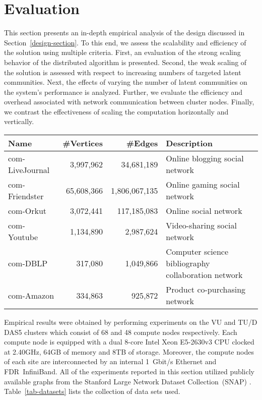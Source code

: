 \section{Evaluation}

This section presents an in-depth empirical analysis of the design discussed in
Section~\ref{design-section}. To this end, we assess the scalability and
efficiency of the solution using multiple criteria.
%
First, an evaluation of the strong scaling behavior of the distributed
algorithm is presented.
%
Second, the weak scaling of the solution is assessed with respect to increasing
numbers of targeted latent communities.
%
Next, the effects of varying the number of latent communities on the system's
performance is analyzed.
%
Further, we evaluate the efficiency and overhead associated with network
communication between cluster nodes.
%
Finally, we contrast the effectiveness of scaling the computation horizontally
and vertically.

\begin{table*}
  \centering
  \begin{tabular}{l r r l}
    Name            & \#Vertices &       \#Edges & Description \\
    \hline
    com-LiveJournal &  3,997,962 &    34,681,189 & Online blogging social network \\
    com-Friendster  & 65,608,366 & 1,806,067,135 & Online gaming social network \\
    com-Orkut       &  3,072,441 &   117,185,083 & Online social network \\
    com-Youtube     &  1,134,890 &     2,987,624 & Video-sharing social network \\
    com-DBLP        &    317,080 &     1,049,866 & Computer science bibliography collaboration network \\
    com-Amazon      &    334,863 &       925,872 & Product co-purchasing network \\
    \hline
  \end{tabular}
  \label{tab-datasets}
  \caption{Summary of SNAP graph data sets used for evaluation.}
\end{table*}

Empirical results were obtained by performing experiments on the VU and TU/D
DAS5 clusters which consist of 68 and 48 compute nodes respectively. Each
compute node is equipped with a dual 8-core Intel Xeon E5-2630v3 CPU clocked
at 2.40GHz, 64GB of memory and 8TB of storage. Moreover, the compute nodes of
each site are interconnected by an internal 1~Gbit/s Ethernet and
FDR~InfiniBand. All of the experiments reported in this section utilized
publicly available graphs from the Stanford Large Network Dataset
Collection~(SNAP) \cite{snapnets}. Table~\ref{tab-datasets} lists the
collection of data sets used.


